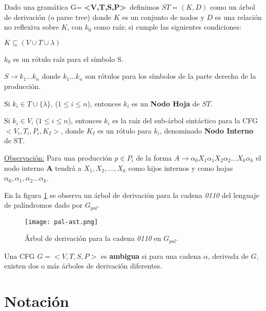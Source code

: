 \begin{definition}
\label{def:arbolderivacion}
Dado una gramática G= \textbf{<V,T,S,P>}\, definimos $ST = (K,D)$ como un árbol de derivación (o parse tree) donde $K$ es un conjunto de nodos y $D$ es una relación no reflexiva sobre $K$, con $k_0$ como raíz; si cumple las siguientes condiciones:

\begin{items}
\item $ K \subseteq (V \cup T \cup \lambda) $
\item $k_{0}$ es un rótulo raíz para el símbolo S.
\item $ S \rightarrow k_{1} \ldots k_{n} $ donde $k_{1} \ldots k_{n}$ son rótulos para los símbolos de la parte derecha de la producción.
\item Si $k_{i} \in T \cup \{\lambda\}$, ($1 \leq i \leq n$), entonces $k_{i}$ es un \textbf{Nodo Hoja} de $ST$. 
\item Si $k_{i} \in V$,  ($1 \leq i \leq n$), entonces $k_{i}$ es la raíz del 
      sub-árbol sintáctico para la CFG $<V_{i},T_{i},P_{i},K_I>$, donde $K_{I}$ es un rótulo para $k_{i}$, denominado \textbf{Nodo Interno} de ST.
\end{items}
\end{definition}

\underline{Observación:} Para una producción $p\in P_{i}$ de la forma $A\rightarrow \alpha_{0}X_{1}\alpha_{1}X_{2}\alpha_{2} \ldots X_{k}\alpha_{k}$ el nodo interno \textbf{A} tendrá a $X_{1}, X_{2},\dots, X_{k}$ como hijos internos y como hojas $\alpha_{0}, \alpha_{1}, \alpha_{2} \ldots \alpha_{k}$.

En la figura \ref{fig:ejePala-st} se observa un árbol de derivación para la cadena \textit{0110} del lenguaje de palíndromos dado por $G_{pal}$.

\begin{figure}[!ht]\centering
\texttt{[image: pal-ast.png]}
\caption{\label{fig:ejePala-st} Árbol de derivación para la cadena \textit{0110} en $G_{pal}$.}
\end{figure}


\begin{definition} Una CFG $G = <V,T,S,P>$ es \textbf{ambigua} si para una cadena $\alpha$, derivada de $G$, existen dos o más árboles de derivación diferentes.
\label{def:ambigua}
\end{definition}

\section*{Notación}

